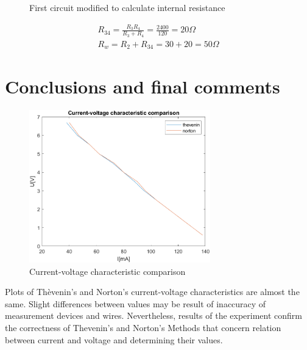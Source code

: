 \documentclass[]{scrartcl}
\begin{document}
\begin{figure}[H]
	\centering
	
	\caption{First circuit modified to calculate internal resistance}
	\label{fig:internal-resistance-reference}
\end{figure}

\begin{equation}
\begin{aligned}
    R_{34}=\frac{R_3R_4}{R_3+R_4}=\frac{2400}{120}=20\Omega \\
    R_w=R_2+R_{34}=30+20=50\Omega
\end{aligned}
\end{equation}

\section{Conclusions and final comments}

\begin{figure}[H]
	\centering
	\includegraphics[width=0.7\textwidth]{Pictures/ct_cv_char_comp.png}
	\caption{Current-voltage characteristic comparison}
	\label{fig:current-voltage-char4}
\end{figure}

Plots of Th\`evenin’s and Norton’s current-voltage characteristics are almost the same. Slight differences between values may be result of inaccuracy of measurement devices and wires. Nevertheless, results of the experiment confirm the correctness of Thevenin’s and Norton’s Methods that concern relation between current and voltage and determining their values.
\end{document}
